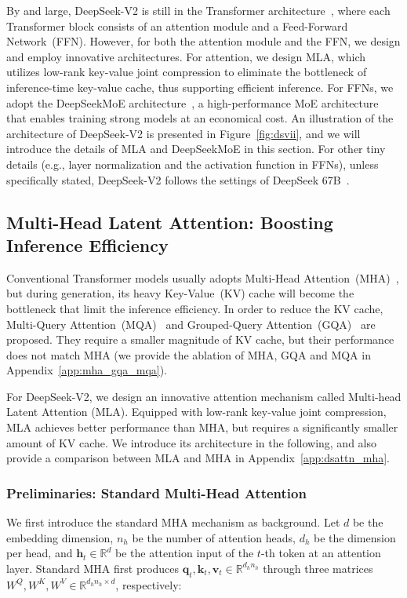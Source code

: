 By and large, DeepSeek-V2 is still in the Transformer architecture~\citep{transformer}, where each Transformer block consists of an attention module and a Feed-Forward Network~(FFN). However, for both the attention module and the FFN, we design and employ innovative architectures. For attention, we design MLA, which utilizes low-rank key-value joint compression to eliminate the bottleneck of inference-time key-value cache, thus supporting efficient inference. For FFNs, we adopt the DeepSeekMoE architecture~\citep{deepseekmoe}, a high-performance MoE architecture that enables training strong models at an economical cost. An illustration of the architecture of DeepSeek-V2 is presented in Figure~\ref{fig:dsvii}, and we will introduce the details of MLA and DeepSeekMoE in this section. For other tiny details (e.g., layer normalization and the activation function in FFNs), unless specifically stated, DeepSeek-V2 follows the settings of DeepSeek 67B~\citep{deepseek1}. 

\subsection{Multi-Head Latent Attention: Boosting Inference Efficiency}

Conventional Transformer models usually adopts Multi-Head Attention~(MHA)~\citep{transformer}, but during generation, its heavy Key-Value~(KV) cache will become the bottleneck that limit the inference efficiency. In order to reduce the KV cache, Multi-Query Attention~(MQA)~\citep{mqa} and Grouped-Query Attention~(GQA)~\citep{ainslie2023gqa} are proposed. They require a smaller magnitude of KV cache, but their performance does not match MHA (we provide the ablation of MHA, GQA and MQA in Appendix~\ref{app:mha_gqa_mqa}).

For DeepSeek-V2, we design an innovative attention mechanism called Multi-head Latent Attention (MLA). Equipped with low-rank key-value joint compression, MLA achieves better performance than MHA, but requires a significantly smaller amount of KV cache. We introduce its architecture in the following, and also provide a comparison between MLA and MHA in Appendix~\ref{app:dsattn_mha}. 

\subsubsection{Preliminaries: Standard Multi-Head Attention}

We first introduce the standard MHA mechanism as background. Let $d$ be the embedding dimension, $n_h$ be the number of attention heads, $d_h$ be the dimension per head, and $\mathbf{h}_{t} \in \mathbb{R}^{d}$ be the attention input of the $t$-th token at an attention layer. Standard MHA first produces $\mathbf{q}_{t}, \mathbf{k}_{t}, \mathbf{v}_{t} \in \mathbb{R}^{d_h n_h}$ through three matrices $W^{Q}, W^{K}, W^{V} \in \mathbb{R}^{d_h n_h \times d}$, respectively:

